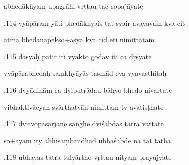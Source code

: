 \documentclass[article,12pt,a4paper]{memoir}%
\newcounter{parCount}
\begin{document}
	  
	  \pstart \leavevmode%
	abhedākhyam upagrāhi vṛttau tac copajāyate 
	{}
	\pend%
      

	  
	  \pstart {}.114 vyāpāraṃ yāti bhedākhyais tat svair avayavaiḥ kva cit 
	{}
	\pend%
      

	  
	  \pstart \leavevmode%
	ātmā bhedānapekṣo+asya kva cid eti nimittatām 
	{}
	\pend%
      

	  
	  \pstart {}.115 dāsyāḥ patir iti vyakto godāv iti ca dṛśyate 
	{}
	\pend%
      

	  
	  \pstart \leavevmode%
	vyāpārabhedaḥ saṃkhyāyās tasmād eva vyavasthitaḥ 
	{}
	\pend%
      

	  
	  \pstart {}.116 dvyādināṃ ca dviputrādau bāhyo bhedo nivartate 
	{}
	\pend%
      

	  
	  \pstart \leavevmode%
	vibhaktivācyaḥ svārthatvān nimittaṃ tv avatiṣṭhate 
	{}
	\pend%
      

	  
	  \pstart {}.117 dvitvopasarjane saṅghe dviśabdas tatra vartate 
	{}
	\pend%
      

	  
	  \pstart \leavevmode%
	so+ayam ity abhisaṃbandhād ubhaśabde na tat tathā 
	{}
	\pend%
      

	  
	  \pstart {}.118 ubhayas tatra tulyārtho vṛttau nityaṃ prayujyate 
	{}
	\pend%
      
\end{document}
